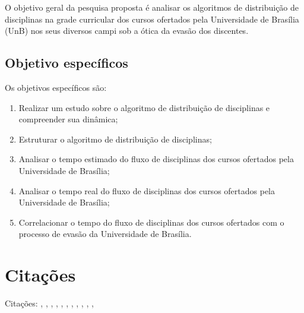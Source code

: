 O objetivo geral da pesquisa proposta é analisar os algoritmos de distribuição de
disciplinas na grade curricular dos cursos ofertados pela Universidade de Brasília (UnB)
nos seus diversos campi sob a ótica da evasão dos discentes.

\subsection{Objetivo específicos}

Os objetivos específicos são:
\begin{enumerate}
	\item Realizar um estudo sobre o algoritmo de distribuição de disciplinas e compreender
sua dinâmica;
	\item Estruturar o algoritmo de distribuição de disciplinas;
	\item Analisar o tempo estimado do fluxo de disciplinas dos cursos ofertados pela Universidade
de Brasília;
\item Analisar o tempo real do fluxo de disciplinas dos cursos ofertados pela Universidade
de Brasília;
\item Correlacionar o tempo do fluxo de disciplinas dos cursos ofertados com o processo
de evasão da Universidade de Brasília.
\end{enumerate}%
\section{Citações}%
   Citações: \cite{Beatriz2007ABrasileiro}, \cite{BRITO2013ImplementacaoEvasao}, 
\cite{Diogo2016PercepcoesPreventivas}, \cite{GlaucoPeresdaSilva2013AnaliseDeterminantes}, \cite{KozelskiPoliticas}, \cite{Mezzari2013EstrategiasEvasao}, \cite{Economia2016NEWTONUnB}, \cite{Sales2014MetodosProfissional}, \cite{SantosBaggi2011EvasaoBibliografica}, \cite{SantosJunior2017A1990}, \cite{Tontini2014Pode-seSuperior}, \cite{Vieira2013DepartamentoFinanciamento}
